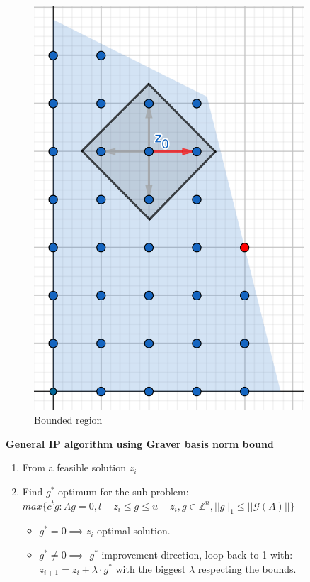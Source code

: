 \begin{figure}[h]
\begin{minipage}[b]{0.45\textwidth}
    \includegraphics[width=0.9\textwidth]{images/IP.png}
    \caption{Bounded region}
\end{minipage}
\end{figure}

\newpage
\label{GB_bound_algorithm}
\textbf{General IP algorithm using Graver basis norm bound}
\vspace{-8pt}
\begin{enumerate}
    \item From a feasible solution $z_i$
    \item Find $g^*$ optimum for the sub-problem: \vspace{4pt}\\
          $max\{c^tg : Ag = 0, l-z_i \leq g \leq u-z_i, g \in \mathbb{Z}^n, ||g||_1 \leq ||\mathcal{G}(A)|| \}$ \vspace{4pt}
    \begin{itemize}
        \item $g^* = 0 \implies z_i$ optimal solution.
        \item $g^* \neq 0 \implies$ $g^*$ improvement direction, loop back to 1 with:\\
        $z_{i+1} = z_i + \lambda \cdot g^*$ with the biggest $\lambda$ respecting the bounds.
    \end{itemize}
\end{enumerate}


